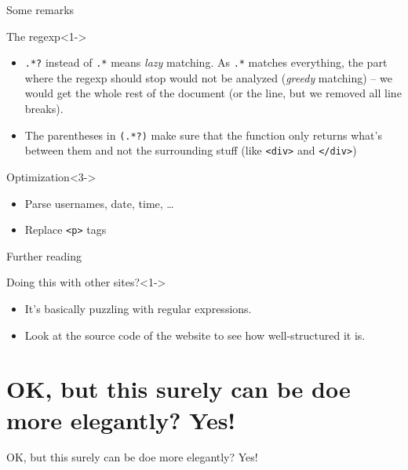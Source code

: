 \documentclass{beamer}
\begin{document}
\begin{frame}{Some remarks}
\begin{block}{The regexp}<1->
\begin{itemize}
\item {\tt{.*?}} instead of {\tt{.*}} means \emph{lazy} matching. As  {\tt{.*}} matches everything, the part where the regexp should stop would not be analyzed (\emph{greedy} matching) -- we would get the whole rest of the document (or the line, but we removed all line breaks).
\item<2->The parentheses in {\tt{(.*?)}} make sure that the function only returns what's between them and not the surrounding stuff (like {\tt{<div>}} and {\tt{</div>}})
\end{itemize}
\end{block}
\begin{block}{Optimization}<3->
\begin{itemize}
\item Parse usernames, date, time, \ldots
\item Replace \texttt{<p>} tags
\end{itemize}
\end{block}

\end{frame}



\begin{frame}{Further reading}

\begin{block}{Doing this with other sites?}<1->
\begin{itemize}
\item It's basically puzzling with regular expressions. 
\item Look at the source code of the website to see how well-structured it is.
\end{itemize}
\end{block}

\end{frame}



\section{OK, but this surely can be doe more elegantly? Yes!}
\begin{frame}
OK, but this surely can be doe more elegantly? Yes!
\end{frame}
\end{document}
